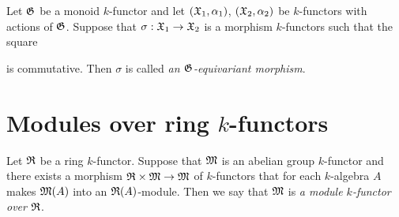 \begin{definition}
Let ${\mathfrak G}$ be a monoid $k$-functor and let $({\mathfrak X}_1,\alpha_1)$, $({\mathfrak X}_2,\alpha_2)$ be $k$-functors with actions of ${\mathfrak G}$. Suppose that $\sigma:{\mathfrak X}_1\rightarrow {\mathfrak X}_2$ is a morphism $k$-functors such that the square
\begin{center}
\end{center}
is commutative. Then $\sigma$ is called \textit{an ${\mathfrak G}$-equivariant morphism}.
\end{definition}

\section{Modules over ring $k$-functors}

\begin{definition}
Let ${\mathfrak R}$ be a ring $k$-functor. Suppose that ${\mathfrak M}$ is an abelian group $k$-functor and there exists a morphism ${\mathfrak R} \times {\mathfrak M}\rightarrow {\mathfrak M}$ of $k$-functors that for each $k$-algebra $A$ makes ${\mathfrak M}(A)$ into an ${\mathfrak R}(A)$-module. Then we say that ${\mathfrak M}$ is \textit{a module $k$-functor over ${\mathfrak R}$}.
\end{definition}

